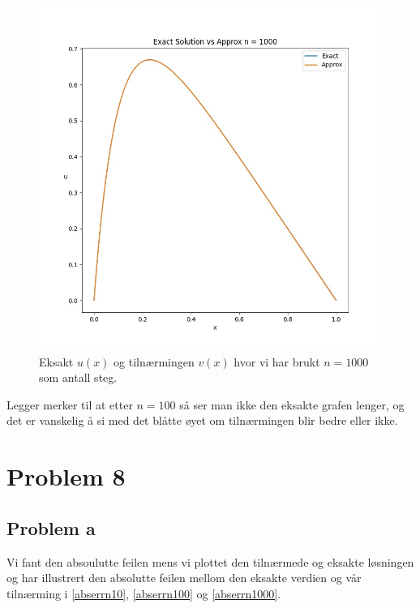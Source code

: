 \documentclass[english,notitlepage]{revtex4-1}  %
\begin{document}
\begin{figure}[h]
\centering
\includegraphics[scale=0.60]{Images/problem7NEW1000.jpg}
\caption{Eksakt $u(x)$ og tilnærmingen $v(x)$ hvor vi har brukt $n = 1000$ som antall steg.}
\label{7n1000}
\end{figure}

Legger merker til at etter $n = 100$ så ser man ikke den eksakte grafen lenger, og det er vanskelig å si med det blåtte øyet om tilnærmingen blir bedre eller ikke.


\section*{Problem 8}

\subsection*{Problem a}
Vi fant den absoulutte feilen mens vi plottet den tilnærmede og eksakte løsningen og har illustrert den absolutte feilen mellom den eksakte verdien og vår tilnærming i \ref{abserrn10}, \ref{abserrn100} og \ref{abserrn1000}.
\end{document}
